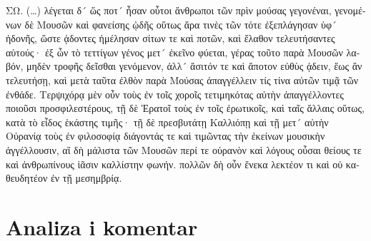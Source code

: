 {\large

\begin{greek}

\noindent ΣΩ. (\dots) λέγεται δ´ ὥς ποτ´ ἦσαν οὗτοι ἄνθρωποι τῶν πρὶν μούσας γεγονέναι, γενομένων δὲ Μουσῶν καὶ φανείσης ᾠδῆς οὕτως ἄρα τινὲς τῶν τότε ἐξεπλάγησαν ὑφ´ ἡδονῆς, ὥστε ᾀδοντες ἠμέλησαν σίτων τε καὶ ποτῶν, καὶ ἔλαθον τελευτήσαντες αὑτούς· ἐξ ὧν τὸ τεττίγων γένος μετ´ ἐκεῖνο φύεται, γέρας τοῦτο παρὰ Μουσῶν λαβόν, μηδὲν τροφῆς δεῖσθαι γενόμενον, ἀλλ´ ἄσιτόν τε καὶ ἄποτον εὐθὺς ᾀδειν, ἕως ἂν τελευτήσῃ, καὶ μετὰ ταῦτα ἐλθὸν παρὰ Μούσας ἀπαγγέλλειν τίς τίνα αὐτῶν τιμᾷ τῶν ἐνθάδε. Τερψιχόρᾳ μὲν οὖν τοὺς ἐν τοῖς χοροῖς τετιμηκότας αὐτὴν ἀπαγγέλλοντες ποιοῦσι προσφιλεστέρους, τῇ δὲ Ἐρατοῖ τοὺς ἐν τοῖς ἐρωτικοῖς, καὶ ταῖς ἄλλαις οὕτως, κατὰ τὸ εἶδος ἑκάστης τιμῆς· τῇ δὲ πρεσβυτάτῃ Καλλιόπῃ καὶ τῇ μετ´ αὐτὴν Οὐρανίᾳ τοὺς ἐν φιλοσοφίᾳ διάγοντάς τε καὶ τιμῶντας τὴν ἐκείνων μουσικὴν ἀγγέλλουσιν, αἳ δὴ μάλιστα τῶν Μουσῶν περί τε οὐρανὸν καὶ λόγους οὖσαι θείους τε καὶ ἀνθρωπίνους ἱᾶσιν καλλίστην φωνήν. πολλῶν δὴ οὖν ἕνεκα λεκτέον τι καὶ οὐ καθευδητέον ἐν τῇ μεσημβρίᾳ.
\end{greek}

}


\section*{Analiza i komentar}


